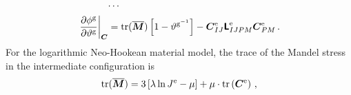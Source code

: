 \documentclass[10pt,letterpaper,oneside]{report}
\newcommand{\ten}[1]{\mbox{\boldmath $#1$}{}}
\newcommand{\tenf}[1]{\mbox{{\sffamily{\bfseries {#1}}}}}
\newcommand{\scas}[1]{\mbox{{\scriptsize{${\rm{#1}}$}}}{}}
\newcommand{\tens}[1]{\mbox{\boldmath{\scriptsize{$#1$}}}{}}
\begin{document}
\begin{align}
\cdots{}& \notag \\
\left. \frac{\partial \phi^{\scas{g}}}{\partial \vartheta^{\scas{g}}} \right|_{\tens{C}}
={}& \mbox{tr} ( \overline{\ten{M}} ) \left[ 1 - \vartheta^{\scas{g}^{-1}} \right]
- \ten{C}^{\scas{e}}_{IJ} \tenf{L}^{\scas{e}}_{IJPM} \ten{C}^{\scas{e}}_{PM} \, . 
\end{align}
For the logarithmic Neo-Hookean material model, the trace of the Mandel stress in the intermediate configuration is 
\begin{equation}
\mbox{tr} (\overline{\ten{M}}) = 3 \left[ \lambda \ln J^{\scas{e}} - \mu \right] + \mu \cdot \mbox{tr} \left( \ten{C}^{\scas{e}} \right) \, , 
\end{equation}
\end{document}
